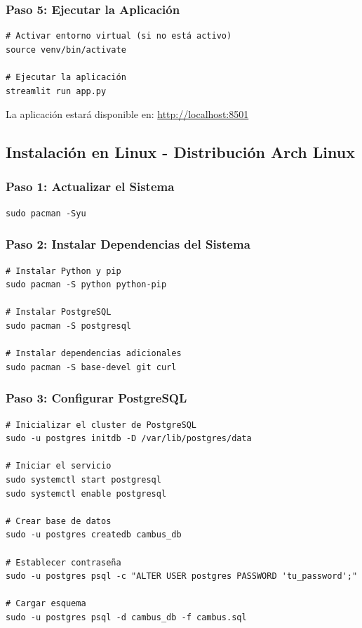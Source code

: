 \documentclass[12pt,a4paper]{article}
\begin{document}
\subsubsection{Paso 5: Ejecutar la Aplicación}

\begin{lstlisting}[style=bash]
# Activar entorno virtual (si no está activo)
source venv/bin/activate

# Ejecutar la aplicación
streamlit run app.py
\end{lstlisting}

La aplicación estará disponible en: \url{http://localhost:8501}

\subsection{Instalación en Linux - Distribución Arch Linux}

\subsubsection{Paso 1: Actualizar el Sistema}

\begin{lstlisting}[style=bash]
sudo pacman -Syu
\end{lstlisting}

\subsubsection{Paso 2: Instalar Dependencias del Sistema}

\begin{lstlisting}[style=bash]
# Instalar Python y pip
sudo pacman -S python python-pip

# Instalar PostgreSQL
sudo pacman -S postgresql

# Instalar dependencias adicionales
sudo pacman -S base-devel git curl
\end{lstlisting}

\subsubsection{Paso 3: Configurar PostgreSQL}

\begin{lstlisting}[style=bash]
# Inicializar el cluster de PostgreSQL
sudo -u postgres initdb -D /var/lib/postgres/data

# Iniciar el servicio
sudo systemctl start postgresql
sudo systemctl enable postgresql

# Crear base de datos
sudo -u postgres createdb cambus_db

# Establecer contraseña
sudo -u postgres psql -c "ALTER USER postgres PASSWORD 'tu_password';"

# Cargar esquema
sudo -u postgres psql -d cambus_db -f cambus.sql
\end{lstlisting}
\end{document}
